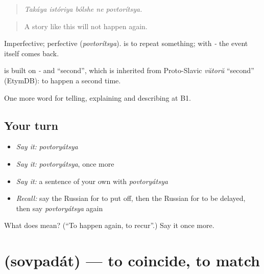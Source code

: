\begin{quote}
\emph{Takáya istóriya bólshe ne povtorítsya.}
\end{quote}

\begin{quote}
A story like this will not happen again.
\end{quote}

Imperfective; perfective \emph{} (\emph{povtorítsya}). \emph{} is to repeat something; with \emph{-} the event itself comes back.

\begin{cousinweb}
\emph{} is built on \emph{-} and \emph{} \textquotedblleft{}second\textquotedblright{}, which is inherited from Proto-Slavic \emph{vŭtorŭ} \textquotedblleft{}second\textquotedblright{} (EtymDB): to happen a second time.
\end{cousinweb}

\begin{grammarlens}[title={What you've built}]
One more word for telling, explaining and describing at B1.
\end{grammarlens}

\subsection*{Your turn}
\begin{itemize}
\raggedright
  \item \emph{Say it:} \emph{povtoryátsya}
  \item \emph{Say it:} \emph{povtoryátsya}, once more
  \item \emph{Say it:} a sentence of your own with \emph{povtoryátsya}
  \item \emph{Recall:} say the Russian for to put off, then the Russian for to be delayed, then say \emph{povtoryátsya} again
\end{itemize}

\begin{tcolorbox}[breakable,colback=teal!4,colframe=teal!35!black,title={Before you move on}]
What does  mean? (\textquotedblleft{}To happen again, to recur\textquotedblright{}.) Say it once more.
\end{tcolorbox}
\section[\texorpdfstring{\ru{совпадать} (sovpadát)}{совпадать (sovpadát)}]{ (sovpadát) — to coincide, to match}

